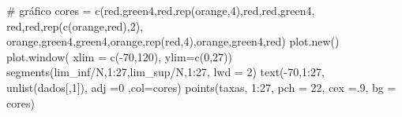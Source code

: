\documentclass[
  letterpaper,
  DIV=11,
  numbers=noendperiod]{scrreprt}
\newenvironment{Shaded}{\begin{snugshade}}{\end{snugshade}}
\newcommand{\AttributeTok}[1]{\textcolor[rgb]{0.40,0.45,0.13}{#1}}
\newcommand{\CommentTok}[1]{\textcolor[rgb]{0.37,0.37,0.37}{#1}}
\newcommand{\DecValTok}[1]{\textcolor[rgb]{0.68,0.00,0.00}{#1}}
\newcommand{\FunctionTok}[1]{\textcolor[rgb]{0.28,0.35,0.67}{#1}}
\newcommand{\NormalTok}[1]{\textcolor[rgb]{0.00,0.23,0.31}{#1}}
\newcommand{\OtherTok}[1]{\textcolor[rgb]{0.00,0.23,0.31}{#1}}
\newcommand{\SpecialCharTok}[1]{\textcolor[rgb]{0.37,0.37,0.37}{#1}}
\newcommand{\StringTok}[1]{\textcolor[rgb]{0.13,0.47,0.30}{#1}}
\theoremstyle{definition}
\theoremstyle{plain}
\theoremstyle{definition}
\theoremstyle{remark}
\begin{document}
\begin{Shaded}
\begin{Highlighting}[]
\CommentTok{\# gráfico}
\NormalTok{cores }\OtherTok{=} \FunctionTok{c}\NormalTok{(}\StringTok{\textquotesingle{}red\textquotesingle{}}\NormalTok{,}\StringTok{\textquotesingle{}green4\textquotesingle{}}\NormalTok{,}\StringTok{\textquotesingle{}red\textquotesingle{}}\NormalTok{,}\FunctionTok{rep}\NormalTok{(}\StringTok{\textquotesingle{}orange\textquotesingle{}}\NormalTok{,}\DecValTok{4}\NormalTok{),}\StringTok{\textquotesingle{}red\textquotesingle{}}\NormalTok{,}\StringTok{\textquotesingle{}red\textquotesingle{}}\NormalTok{,}\StringTok{\textquotesingle{}green4\textquotesingle{}}\NormalTok{,}
          \StringTok{\textquotesingle{}red\textquotesingle{}}\NormalTok{,}\StringTok{\textquotesingle{}red\textquotesingle{}}\NormalTok{,}\FunctionTok{rep}\NormalTok{(}\FunctionTok{c}\NormalTok{(}\StringTok{\textquotesingle{}orange\textquotesingle{}}\NormalTok{,}\StringTok{\textquotesingle{}red\textquotesingle{}}\NormalTok{),}\DecValTok{2}\NormalTok{), }\StringTok{\textquotesingle{}orange\textquotesingle{}}\NormalTok{,}\StringTok{\textquotesingle{}green4\textquotesingle{}}\NormalTok{,}\StringTok{\textquotesingle{}green4\textquotesingle{}}\NormalTok{,}\StringTok{\textquotesingle{}orange\textquotesingle{}}\NormalTok{,}\FunctionTok{rep}\NormalTok{(}\StringTok{\textquotesingle{}red\textquotesingle{}}\NormalTok{,}\DecValTok{4}\NormalTok{),}\StringTok{\textquotesingle{}orange\textquotesingle{}}\NormalTok{,}\StringTok{\textquotesingle{}green4\textquotesingle{}}\NormalTok{,}\StringTok{\textquotesingle{}red\textquotesingle{}}\NormalTok{)}
\FunctionTok{plot.new}\NormalTok{()}
\FunctionTok{plot.window}\NormalTok{( }\AttributeTok{xlim =} \FunctionTok{c}\NormalTok{(}\SpecialCharTok{{-}}\DecValTok{70}\NormalTok{,}\DecValTok{120}\NormalTok{), }\AttributeTok{ylim=}\FunctionTok{c}\NormalTok{(}\DecValTok{0}\NormalTok{,}\DecValTok{27}\NormalTok{))}
\FunctionTok{segments}\NormalTok{(lim\_inf}\SpecialCharTok{/}\NormalTok{N,}\DecValTok{1}\SpecialCharTok{:}\DecValTok{27}\NormalTok{,lim\_sup}\SpecialCharTok{/}\NormalTok{N,}\DecValTok{1}\SpecialCharTok{:}\DecValTok{27}\NormalTok{, }\AttributeTok{lwd =} \DecValTok{2}\NormalTok{)}
\FunctionTok{text}\NormalTok{(}\SpecialCharTok{{-}}\DecValTok{70}\NormalTok{,}\DecValTok{1}\SpecialCharTok{:}\DecValTok{27}\NormalTok{, }\FunctionTok{unlist}\NormalTok{(dados[,}\DecValTok{1}\NormalTok{]), }\AttributeTok{adj =}\DecValTok{0}\NormalTok{ ,}\AttributeTok{col=}\NormalTok{cores)}
\FunctionTok{points}\NormalTok{(taxas, }\DecValTok{1}\SpecialCharTok{:}\DecValTok{27}\NormalTok{, }\AttributeTok{pch =} \DecValTok{22}\NormalTok{, }\AttributeTok{cex =}\NormalTok{.}\DecValTok{9}\NormalTok{, }\AttributeTok{bg =}\NormalTok{ cores)}
\end{Highlighting}
\end{Shaded}
\end{document}

